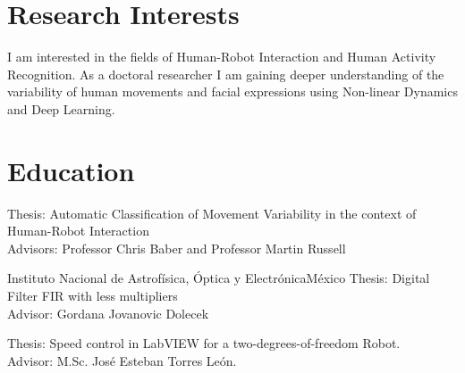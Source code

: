 \documentclass[10pt,a4paper,roman]{moderncv}
\begin{document}
\section{Research Interests}
\begin{changemargin}{2.4cm}{0.5cm}
I am interested in the fields of Human-Robot Interaction and Human Activity Recognition.
As a doctoral researcher I am gaining deeper understanding of the variability
of human movements and facial expressions using Non-linear Dynamics and Deep Learning.
\end{changemargin}



\section{Education}
  {Thesis: Automatic Classification of Movement Variability in the context of Human-Robot Interaction
  \href{https://github.com/mxochicale/PhD}{\faGithubAlt}
   \\ Advisors: Professor Chris Baber and  Professor Martin Russell  }

  {Instituto Nacional de Astrof\'isica, \'Optica y Electr\'onica}{M\'exico}{}
  {Thesis: Digital Filter FIR with less multipliers
  \href{https://github.com/mxochicale/publications/blob/master/Thesis/M.Sc./doc/MPXochicale_MScThesis-2016.pdf}{\faFilePdfO}
  \href{https://github.com/mxochicale/publications/tree/master/Thesis/M.Sc.}{\faGithubAlt}
  \\ Advisor: Gordana Jovanovic Dolecek}

  {Thesis: Speed control in LabVIEW for a two-degrees-of-freedom Robot.
  \href{https://github.com/mxochicale/publications/blob/master/Thesis/B.Eng./doc/MPXochicale_BachelorEngThesis-2003.pdf}{\faFilePdfO}
  \href{https://github.com/mxochicale/publications/tree/master/Thesis/B.Eng.}{\faGithubAlt}
  \\ Advisor: M.Sc. Jos\'e Esteban Torres Le\'on.}
\end{document}
